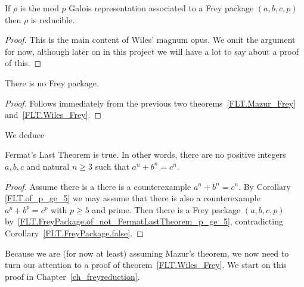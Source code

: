 \begin{theorem}
  \label{FLT.Wiles_Frey}
  \leanok
  If $\rho$ is the mod $p$ Galois representation associated to a Frey package $(a,b,c,p)$ then
  $\rho$ is reducible.
\end{theorem}
\begin{proof}
  This is the main content of Wiles' magnum opus.
  We omit the argument for now, although later on in this project
  we will have a lot to say about a proof of this.
\end{proof}

\begin{corollary}
  \label{FLT.FreyPackage.false}
  \leanok
  There is no Frey package.
\end{corollary}
\begin{proof}\leanok Follows immediately from the previous two
  theorems~\ref{FLT.Mazur_Frey} and~\ref{FLT.Wiles_Frey}.
\end{proof}

We deduce

\begin{corollary}
  \label{FLT}
  \leanok
  Fermat's Last Theorem is true. In other words, there are no positive integers $a,b,c$ and
  natural $n\geq3$ such that $a^n+b^n=c^n$.
\end{corollary}
\begin{proof}
  \leanok
  Assume there is a there is a counterexample $a^n+b^n=c^n$.
  By Corollary \ref{FLT.of_p_ge_5} we may assume that there is also a counterexample
  $a^p+b^p=c^p$ with $p\geq 5$ and prime.
  Then there is a Frey package $(a,b,c,p)$ by~\ref{FLT.FreyPackage.of_not_FermatLastTheorem_p_ge_5},
  contradicting Corollary~\ref{FLT.FreyPackage.false}.
\end{proof}

Because we are (for now at least) assuming Mazur's theorem, we now need to turn our attention
to a proof of theorem~\ref{FLT.Wiles_Frey}. We start on this proof in Chapter~\ref{ch_freyreduction}.
